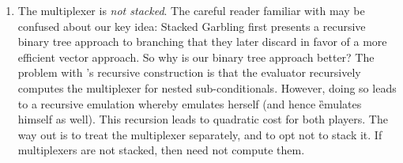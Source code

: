 \begin{enumerate}
  \item The multiplexer is \emph{not stacked}.
    The careful reader familiar with \cite{EPRINT:HeaKol20b} may be
    confused about our key idea: Stacked Garbling first presents a
    recursive binary tree approach to branching that they later
    discard in favor of a more efficient vector approach.
    So why is our binary tree approach better?
    The problem with \cite{EPRINT:HeaKol20b}'s recursive construction
    is that the evaluator recursively computes the multiplexer for
    nested sub-conditionals.
    However, doing so leads to a recursive emulation whereby \E
    emulates herself (and hence \G emulates himself as well).
    This recursion leads to quadratic cost for both players.
    The way out is to treat the multiplexer separately, and to opt not
    to stack it.
    If multiplexers are not stacked, then \E need not compute them.
\end{enumerate}


